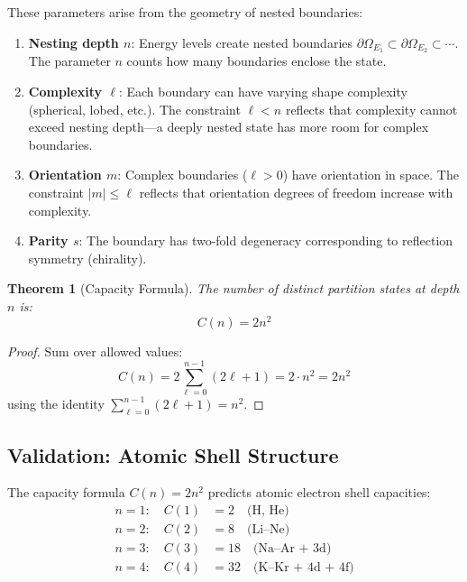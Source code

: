 \documentclass[twocolumn,aps,prx,superscriptaddress,longbibliography]{revtex4-2}
\newtheorem{theorem}{Theorem}[section]
\theoremstyle{remark}
\begin{document}
These parameters arise from the geometry of nested boundaries:

\begin{enumerate}
    \item \textbf{Nesting depth $n$}: Energy levels create nested boundaries
    $\partial\Omega_{E_1} \subset \partial\Omega_{E_2} \subset \cdots$. The
    parameter $n$ counts how many boundaries enclose the state.

    \item \textbf{Complexity $\ell$}: Each boundary can have varying shape
    complexity (spherical, lobed, etc.). The constraint $\ell < n$ reflects
    that complexity cannot exceed nesting depth---a deeply nested state has
    more room for complex boundaries.

    \item \textbf{Orientation $m$}: Complex boundaries ($\ell > 0$) have
    orientation in space. The constraint $|m| \leq \ell$ reflects that
    orientation degrees of freedom increase with complexity.

    \item \textbf{Parity $s$}: The boundary has two-fold degeneracy
    corresponding to reflection symmetry (chirality).
\end{enumerate}

\begin{theorem}[Capacity Formula]
\label{thm:capacity}
The number of distinct partition states at depth $n$ is:
\begin{equation}
C(n) = 2n^2
\label{eq:capacity}
\end{equation}
\end{theorem}

\begin{proof}
Sum over allowed values:
\begin{equation}
C(n) = 2 \sum_{\ell=0}^{n-1} (2\ell + 1) = 2 \cdot n^2 = 2n^2
\end{equation}
using the identity $\sum_{\ell=0}^{n-1}(2\ell+1) = n^2$.
\end{proof}

\subsection{Validation: Atomic Shell Structure}

The capacity formula $C(n) = 2n^2$ predicts atomic electron shell capacities:
\begin{align}
n = 1: \quad C(1) &= 2 \quad \text{(H, He)} \\
n = 2: \quad C(2) &= 8 \quad \text{(Li--Ne)} \\
n = 3: \quad C(3) &= 18 \quad \text{(Na--Ar + 3d)} \\
n = 4: \quad C(4) &= 32 \quad \text{(K--Kr + 4d + 4f)}
\end{align}
\end{document}
